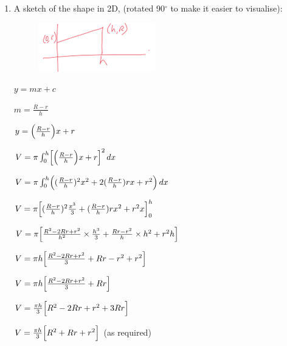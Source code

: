 \documentclass[../main.tex]{subfiles}
\begin{document}
\begin{spacing}{1.5}
\begin{enumerate}[itemsep=0.7cm]
\begin{enumerate}
    \end{enumerate}
    
    \item 
    A sketch of the shape in 2D, (rotated 90$^\circ$ to make it easier to visualise):

    \begin{figure}[h!]
        \centering
        \includegraphics{images/volrev20.png}
    \end{figure}

    $y=mx+c$

    $m=\frac{R-r}{h}$

    $y=\Bigl(\frac{R-r}{h}\Bigr)x+r$

    $V=\pi \int_0^h \Bigl[\Bigl(\frac{R-r}{h}\Bigr)x+r\Bigr]^2\,dx$

    $V=\pi \int_0^h \Bigl((\frac{R-r}{h})^2x^2 +2(\frac{R-r}{h})rx+r^2\Bigr)\, dx$

    $V=\pi \Bigl[(\frac{R-r}{h})^2 \frac{x^3}{3}+(\frac{R-r}{h})rx^2+r^2x\Bigr]_0^h$

    $V=\pi \Bigl[\frac{R^2-2Rr+r^2}{h^2}\times \frac{h^3}{3}+\frac{Rr-r^2}{h}\times h^2 +r^2h\Bigr]$

    $V=\pi h\Bigl[\frac{R^2-2Rr+r^2}{3}+Rr-r^2+r^2\Bigr]$

    $V=\pi h\Bigl[\frac{R^2-2Rr+r^2}{3}+Rr\Bigr]$

    $V=\frac{\pi h}{3}\Bigl[R^2-2Rr+r^2+3Rr\Bigr]$

    $V=\frac{\pi h}{3}\Bigl[R^2+Rr+r^2\Bigr]$ (as required)

\end{enumerate}


\pagebreak
\end{spacing}
\end{document}

